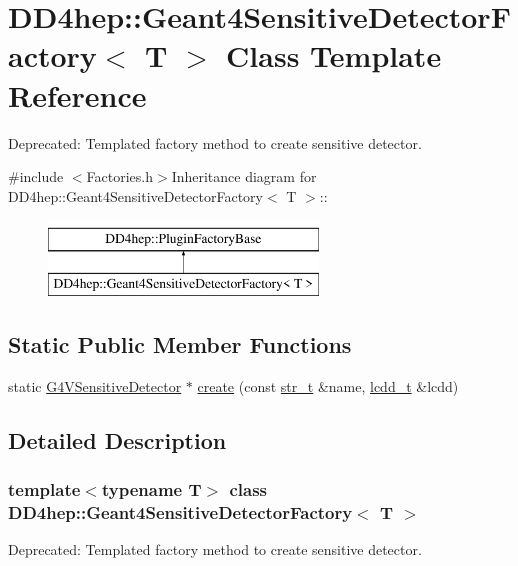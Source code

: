 \hypertarget{class_d_d4hep_1_1_geant4_sensitive_detector_factory}{
\section{DD4hep::Geant4SensitiveDetectorFactory$<$ T $>$ Class Template Reference}
\label{class_d_d4hep_1_1_geant4_sensitive_detector_factory}
}


Deprecated: Templated factory method to create sensitive detector.  


{\ttfamily \#include $<$Factories.h$>$}Inheritance diagram for DD4hep::Geant4SensitiveDetectorFactory$<$ T $>$::\begin{figure}[H]
\begin{center}
\leavevmode
\includegraphics[height=2cm]{class_d_d4hep_1_1_geant4_sensitive_detector_factory}
\end{center}
\end{figure}
\subsection*{Static Public Member Functions}
\begin{DoxyCompactItemize}
\item 
static \hyperlink{class_g4_v_sensitive_detector}{G4VSensitiveDetector} $\ast$ \hyperlink{class_d_d4hep_1_1_geant4_sensitive_detector_factory_a2a64f7e0f2f4ca7076b273b7725b6717}{create} (const \hyperlink{struct_d_d4hep_1_1_plugin_factory_base_aaa4c6d8801f70db2776c5473abc92692}{str\_\-t} \&name, \hyperlink{class_d_d4hep_1_1_geometry_1_1_l_c_d_d}{lcdd\_\-t} \&lcdd)
\end{DoxyCompactItemize}


\subsection{Detailed Description}
\subsubsection*{template$<$typename T$>$ class DD4hep::Geant4SensitiveDetectorFactory$<$ T $>$}

Deprecated: Templated factory method to create sensitive detector. 

